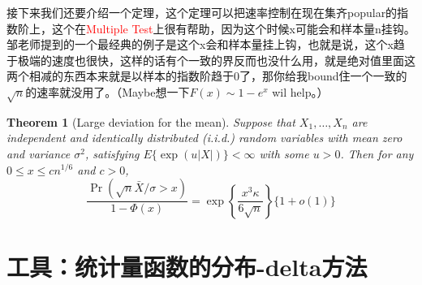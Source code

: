 \documentclass{article}
\newtheorem{theorem}{Theorem}[section]
\begin{document}
\par 接下来我们还要介绍一个定理，这个定理可以把速率控制在现在集齐popular的指数阶上，这个在\textcolor{red}{Multiple Test}上很有帮助，因为这个时候x可能会和样本量n挂钩。邹老师提到的一个最经典的例子是这个x会和样本量挂上钩，也就是说，这个x趋于极端的速度也很快，这样的话有个一致的界反而也没什么用，就是绝对值里面这两个相减的东西本来就是以样本的指数阶趋于0了，那你给我bound住一个一致的$\sqrt{n}$的速率就没用了。（Maybe想一下$F(x)\sim 1-e^{x}$ wil help。）
\begin{theorem}[Large deviation for the mean]
	Suppose that $X_1, \ldots, X_n$ are independent and identically distributed (i.i.d.) random variables with mean zero and variance $\sigma^2$, satisfying $E\{\exp (u|X|)\}<\infty$ with some $u>0$. Then for any $0 \leq x \leq c n^{1 / 6}$ and $c>0$,
	$$
	\frac{\operatorname{Pr}(\sqrt{n} \bar{X} / \sigma>x)}{1-\Phi(x)}=\exp \left\{\frac{x^3 \kappa}{6 \sqrt{n}}\right\}\{1+o(1)\}
	$$
\end{theorem}
\section{工具：统计量函数的分布-delta方法}
\end{document}
